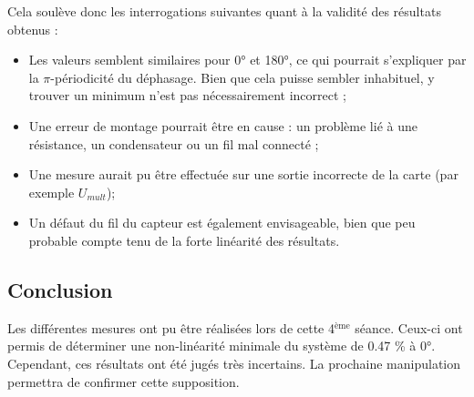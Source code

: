     Cela soulève donc les interrogations suivantes quant à la validité des résultats obtenus : 

    \begin{itemize} \item Les valeurs semblent similaires pour 0° et 180°, ce qui pourrait
         s'expliquer par la $\pi$-périodicité du déphasage. Bien que cela puisse sembler inhabituel, 
         y trouver un minimum n'est pas nécessairement incorrect ;
         \item Une erreur de montage pourrait être en cause : un problème lié à une résistance, 
         un condensateur ou un fil mal connecté ; 
         \item Une mesure aurait pu être effectuée sur une sortie incorrecte de la carte (par exemple $U_{mult}$); 
         \item Un défaut du fil du capteur est également envisageable, bien que peu probable compte 
         tenu de la forte linéarité des résultats. 
        \end{itemize}

        \subsection{Conclusion}

        Les différentes mesures ont pu être réalisées lors de cette 4$^{\text{ème}}$ séance. Ceux-ci ont
        permis de déterminer une non-linéarité minimale du système de 0.47 \% à 0°. Cependant,
        ces résultats ont été jugés très incertains. La prochaine manipulation permettra de 
        confirmer cette supposition.  